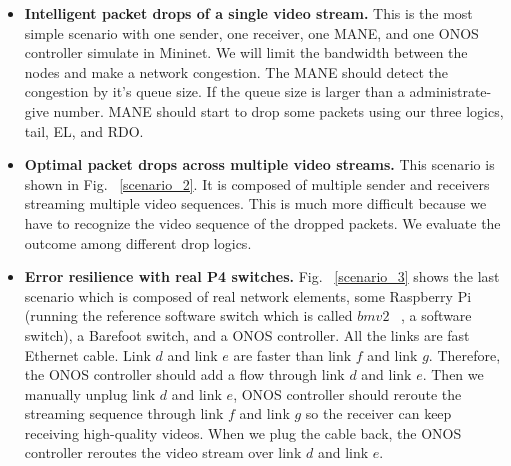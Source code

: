 \begin{itemize}
    \item{\bf Intelligent packet drops of a single video stream.}
    This is the most simple scenario with one sender, one receiver, one MANE, and one ONOS controller simulate in Mininet. We will limit the bandwidth between the nodes and make a network congestion. The MANE should detect the congestion by it's queue size. If the queue size is larger than a administrate-give number. MANE should start to drop some packets using our three logics, tail, EL, and RDO. 
    \item{\bf Optimal packet drops across multiple video streams.}
    This scenario is shown in Fig. ~\ref{scenario_2}. It is composed of multiple sender and receivers streaming multiple video sequences. This is much more difficult because we have to recognize the video sequence of the dropped packets. We evaluate the outcome among different drop logics.
    \item {\bf Error resilience with real P4 switches.}
    Fig. ~\ref{scenario_3} shows the last scenario which is composed of real network elements, some Raspberry Pi (running the reference software switch which is called $bmv2$ ~\cite{bmv2}, a software switch), a Barefoot switch, and a ONOS controller. All the links are fast Ethernet cable. Link $d$ and link $e$ are faster than link $f$ and link $g$. Therefore, the ONOS controller should add a flow through link $d$ and link $e$. Then we manually unplug link $d$ and link $e$, ONOS controller should reroute the streaming sequence through link $f$ and link $g$ so the receiver can keep receiving high-quality videos. When we plug the cable back, the ONOS controller reroutes the video stream over link $d$ and link $e$.
\end{itemize}
